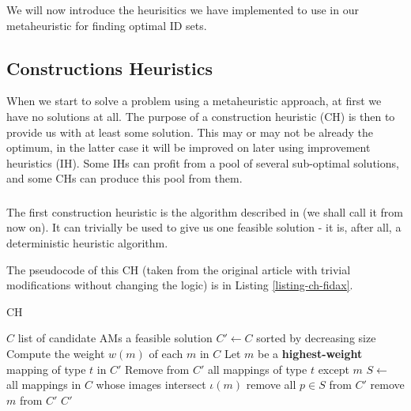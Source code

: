 We will now introduce the heurisitics we have implemented to use in our metaheuristic for finding optimal ID sets.

\subsection{Constructions Heuristics}
\label{section-mip-chs}

When we start to solve a problem using a metaheuristic approach, at first we have no solutions at all. The purpose of a construction heuristic (CH) is then to provide us with at least some solution. This may or may not be already the optimum, in the latter case it will be improved on later using improvement heuristics (IH). Some IHs can profit from a pool of several sub-optimal solutions, and some CHs can produce this pool from them.

\subsubsection{}
\label{section-mip-fidax}

The first construction heuristic is the algorithm described in \cite{fidax} (we shall call it  from now on). It can trivially be used to give us one feasible solution - it is, after all, a deterministic heuristic algorithm.

The pseudocode of this CH (taken from the original article with trivial modifications without changing the logic) is in Listing \ref{listing-ch-fidax}.

\begin{algorithm}
\caption{ CH}
\label{listing-ch-fidax}
\begin{algorithmic}
\REQUIRE $C$ list of candidate AMs
\ENSURE a feasible solution
\STATE $C' \gets C$ sorted by decreasing size
\STATE Compute the weight $w(m)$ of each $m$ in $C$
  \STATE Let $m$ be a \textbf{highest-weight} mapping of type $t$ in $C'$
  \STATE Remove from $C'$ all mappings of type $t$ except $m$
\ENDFOR
{}
  \STATE $S \gets$ all mappings in $C$ whose images intersect $\iota(m)$
    \STATE remove all $p \in S$ from $C'$
  \ELSE
    \STATE remove $m$ from $C'$
  \ENDIF
\ENDFOR
\RETURN $C'$
\end{algorithmic}
\end{algorithm}

